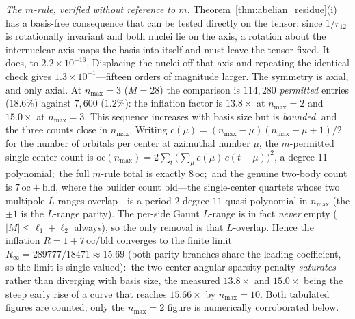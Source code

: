 \documentclass[aps,pra,twocolumn,superscriptaddress,longbibliography]{revtex4-2}
\begin{document}
\emph{The $m$-rule, verified without reference to $m$.}
Theorem~\ref{thm:abelian_residue}(i) has a basis-free consequence that can
be tested directly on the tensor: since $1/r_{12}$ is rotationally
invariant and both nuclei lie on the axis, a rotation about the
internuclear axis maps the basis into itself and must leave the tensor
fixed.  It does, to $2.2 \times 10^{-16}$.  Displacing the nuclei off that
axis and repeating the identical check gives $1.3 \times 10^{-1}$---fifteen
orders of magnitude larger.  The symmetry is axial, and only axial.  At $n_{\max} = 3$ ($M = 28$) the comparison is
$114{,}280$ \emph{permitted} entries ($18.6\%$) against $7{,}600$
($1.2\%$): the inflation factor is $13.8\times$ at $n_{\max} = 2$ and
$15.0\times$ at $n_{\max} = 3$.  This sequence increases with basis size but
is \emph{bounded}, and the three counts close in $n_{\max}$.  Writing
$c(\mu) = (n_{\max}-\mu)(n_{\max}-\mu+1)/2$ for the number of orbitals per
center at azimuthal number $\mu$, the $m$-permitted single-center count is
$\mathrm{oc}(n_{\max}) = 2\sum_{t}\big(\sum_{\mu} c(\mu)\,c(t-\mu)\big)^{2}$,
a degree-$11$ polynomial;\ the full $m$-rule total is exactly
$8\,\mathrm{oc}$;\ and the genuine two-body count is $7\,\mathrm{oc}
+ \mathrm{bld}$, where the builder count $\mathrm{bld}$---the single-center
quartets whose two multipole $L$-ranges overlap---is a period-$2$
degree-$11$ quasi-polynomial in $n_{\max}$ (the $\pm 1$ is the $L$-range
parity).  The per-side Gaunt $L$-range is in fact \emph{never} empty
($|M| \le \ell_1 + \ell_2$ always), so the only removal is that
$L$-overlap.  Hence the inflation $R = 1 + 7\,\mathrm{oc}/\mathrm{bld}$
converges to the finite limit $R_\infty = 289777/18471 \approx 15.69$
(both parity branches share the leading coefficient, so the limit is
single-valued):\ the two-center angular-sparsity penalty \emph{saturates}
rather than diverging with basis size, the measured $13.8\times$ and
$15.0\times$ being the steep early rise of a curve that reaches $15.66\times$
by $n_{\max} = 10$.  Both tabulated figures are counted; only the
$n_{\max} = 2$ figure is numerically corroborated below.
\end{document}
